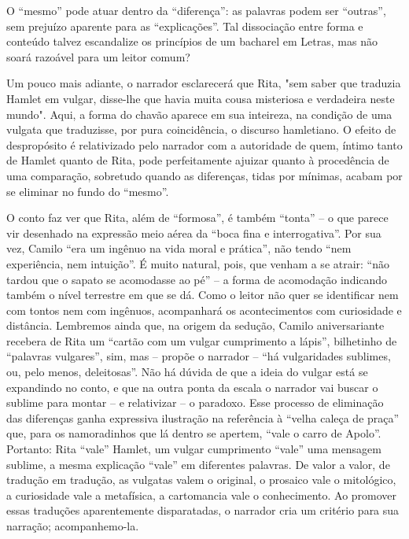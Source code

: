 O ``mesmo'' pode atuar dentro da ``diferença'': as palavras podem ser
``outras'', sem prejuízo aparente para as ``explicações''. Tal
dissociação entre forma e conteúdo talvez escandalize os princípios de
um bacharel em Letras, mas não soará razoável para um leitor comum?

Um pouco mais adiante, o narrador esclarecerá que Rita, "sem saber que
traduzia Hamlet em vulgar, disse-lhe que havia muita cousa misteriosa e
verdadeira neste mundo". Aqui, a forma do chavão aparece em sua
inteireza, na condição de uma vulgata que traduzisse, por pura
coincidência, o discurso hamletiano. O efeito de despropósito é
relativizado pelo narrador com a autoridade de quem, íntimo tanto de
Hamlet quanto de Rita, pode perfeitamente ajuizar quanto à procedência
de uma comparação, sobretudo quando as diferenças, tidas por mínimas,
acabam por se eliminar no fundo do ``mesmo''.

O conto faz ver que Rita, além de ``formosa'', é também ``tonta'' -- o
que parece vir desenhado na expressão meio aérea da ``boca fina e
interrogativa''. Por sua vez, Camilo ``era um ingênuo na vida moral e
prática'', não tendo ``nem experiência, nem intuição''. É muito natural,
pois, que venham a se atrair: ``não tardou que o sapato se acomodasse ao
pé'' -- a forma de acomodação indicando também o nível terrestre em que
se dá. Como o leitor não quer se identificar nem com tontos nem com
ingênuos, acompanhará os acontecimentos com curiosidade e distância.
Lembremos ainda que, na origem da sedução, Camilo aniversariante
recebera de Rita um ``cartão com um vulgar cumprimento a lápis'',
bilhetinho de ``palavras vulgares'', sim, mas -- propõe o narrador --
``há vulgaridades sublimes, ou, pelo menos, deleitosas''. Não há dúvida
de que a ideia do vulgar está se expandindo no conto, e que na outra
ponta da escala o narrador vai buscar o sublime para montar -- e
relativizar -- o paradoxo. Esse processo de eliminação das diferenças
ganha expressiva ilustração na referência à ``velha caleça de praça''
que, para os namoradinhos que lá dentro se apertem, ``vale o carro de
Apolo''. Portanto: Rita ``vale'' Hamlet, um vulgar cumprimento ``vale''
uma mensagem sublime, a mesma explicação ``vale'' em diferentes
palavras. De valor a valor, de tradução em tradução, as vulgatas valem o
original, o prosaico vale o mitológico, a curiosidade vale a metafísica,
a cartomancia vale o conhecimento. Ao promover essas traduções
aparentemente disparatadas, o narrador cria um critério para sua
narração; acompanhemo-la.

